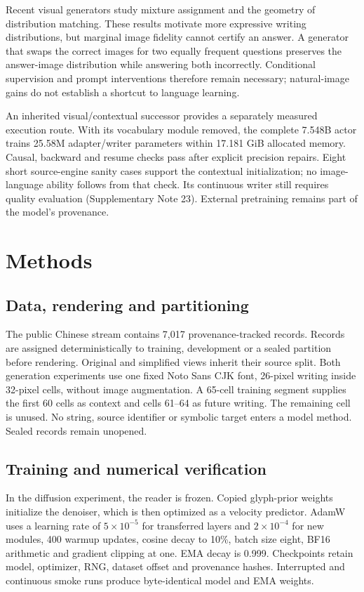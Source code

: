 Recent visual generators study mixture assignment and the geometry of
distribution matching\cite{mgflow,semot}. These results motivate more expressive
writing distributions, but marginal image fidelity cannot certify an answer.
A generator that swaps the correct images for two equally frequent questions
preserves the answer-image distribution while answering both incorrectly.
Conditional supervision and prompt interventions therefore remain necessary;
natural-image gains do not establish a shortcut to language learning.

An inherited visual/contextual successor provides a separately measured
execution route. With its vocabulary module removed, the complete 7.548B
actor trains 25.58M adapter/writer parameters within 17.181 GiB allocated
memory. Causal, backward and resume checks pass after explicit precision
repairs. Eight short source-engine sanity cases support the contextual
initialization; no image-language ability follows from that check. Its
continuous writer still requires quality evaluation (Supplementary Note 23).
External pretraining remains part of the model's provenance.

\section*{Methods}
\subsection*{Data, rendering and partitioning}
The public Chinese stream contains 7,017 provenance-tracked records. Records
are assigned deterministically to training, development or a sealed partition
before rendering. Original and simplified views inherit their source split.
Both generation experiments use one fixed Noto Sans CJK font, 26-pixel writing
inside 32-pixel cells, without image augmentation. A 65-cell training segment
supplies the first 60 cells as context and cells 61--64 as future writing.
The remaining cell is unused. No string, source identifier or symbolic target
enters a model method. Sealed records remain unopened.

\subsection*{Training and numerical verification}
In the diffusion experiment, the reader is frozen. Copied glyph-prior weights initialize the denoiser,
which is then optimized as a velocity predictor. AdamW uses a learning rate of
$5\times10^{-5}$ for transferred layers and $2\times10^{-4}$ for new modules,
400 warmup updates, cosine decay to 10\%, batch size eight, BF16 arithmetic and
gradient clipping at one. EMA decay is 0.999. Checkpoints retain model,
optimizer, RNG, dataset offset and provenance hashes. Interrupted and
continuous smoke runs produce byte-identical model and EMA weights.

